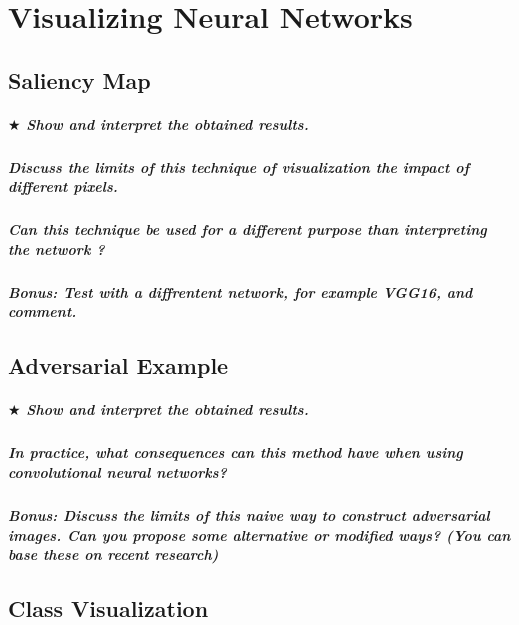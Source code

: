 \chapter{Visualizing Neural Networks}

\section{Saliency Map}
\paragraph*{$ \bigstar $ Show and interpret the obtained results.}
\paragraph*{Discuss the limits of this technique of visualization the impact of different pixels.}
\paragraph*{Can this technique be used for a different purpose than interpreting the network ?}
\paragraph*{\textbf{Bonus:} Test with a diffrentent network, for example VGG16, and comment.}



\section{Adversarial Example}
\paragraph*{$ \bigstar $ Show and interpret the obtained results.}
\paragraph*{In practice, what consequences can this method have when using convolutional neural networks?}
\paragraph*{\textbf{Bonus:} Discuss the limits of this naive way to construct adversarial images. Can you propose some alternative or modiﬁed ways? (You can base these on recent research)}


\section{Class Visualization}
